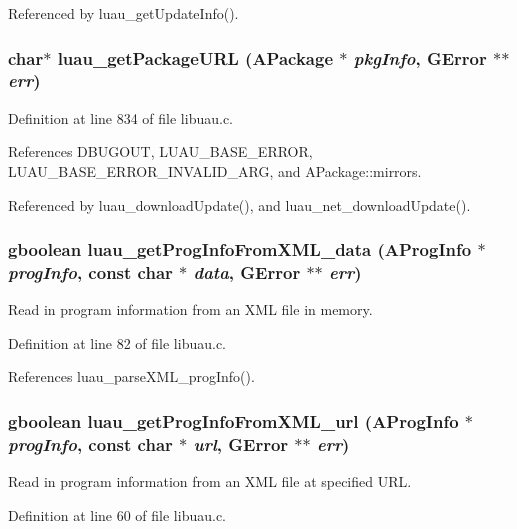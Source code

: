 Referenced by luau\_\-get\-Update\-Info().
\subsubsection{\setlength{\rightskip}{0pt plus 5cm}char$\ast$ luau\_\-get\-Package\-URL ({\bf APackage} $\ast$ {\em pkg\-Info}, GError $\ast$$\ast$ {\em err})}\label{libuau_8h_a75}




Definition at line 834 of file libuau.c.

References DBUGOUT, LUAU\_\-BASE\_\-ERROR, LUAU\_\-BASE\_\-ERROR\_\-INVALID\_\-ARG, and APackage::mirrors.

Referenced by luau\_\-download\-Update(), and luau\_\-net\_\-download\-Update().
\subsubsection{\setlength{\rightskip}{0pt plus 5cm}gboolean luau\_\-get\-Prog\-Info\-From\-XML\_\-data ({\bf AProg\-Info} $\ast$ {\em prog\-Info}, const char $\ast$ {\em data}, GError $\ast$$\ast$ {\em err})}\label{libuau_8h_a51}


Read in program information from an XML file in memory. 



Definition at line 82 of file libuau.c.

References luau\_\-parse\-XML\_\-prog\-Info().
\subsubsection{\setlength{\rightskip}{0pt plus 5cm}gboolean luau\_\-get\-Prog\-Info\-From\-XML\_\-url ({\bf AProg\-Info} $\ast$ {\em prog\-Info}, const char $\ast$ {\em url}, GError $\ast$$\ast$ {\em err})}\label{libuau_8h_a50}


Read in program information from an XML file at specified URL. 



Definition at line 60 of file libuau.c.

